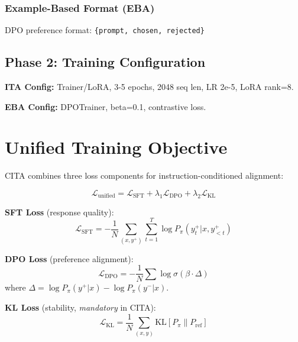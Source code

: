 \subsubsection{Example-Based Format (EBA)}

DPO preference format: \texttt{\{prompt, chosen, rejected\}}

\subsection{Phase 2: Training Configuration}

\textbf{ITA Config:} Trainer/LoRA, 3-5 epochs, 2048 seq len, LR 2e-5, LoRA rank=8.

\textbf{EBA Config:} DPOTrainer, beta=0.1, contrastive loss.


\section{Unified Training Objective}
\label{sec:unified_loss}

CITA combines three loss components for instruction-conditioned alignment:

\begin{equation}
\mathcal{L}_{\text{unified}} = \mathcal{L}_{\text{SFT}} + \lambda_1 \mathcal{L}_{\text{DPO}} + \lambda_2 \mathcal{L}_{\text{KL}}
\end{equation}

\noindent\textbf{SFT Loss} (response quality):
\begin{equation}
\mathcal{L}_{\text{SFT}} = -\frac{1}{N} \sum_{(x, y^+)} \sum_{t=1}^{T} \log P_\pi(y_t^+ | x, y_{<t}^+)
\end{equation}

\noindent\textbf{DPO Loss} (preference alignment):
\begin{equation}
\mathcal{L}_{\text{DPO}} = -\frac{1}{N} \sum \log \sigma \left( \beta \cdot \Delta \right)
\end{equation}
where $\Delta = \log P_\pi(y^+|x) - \log P_\pi(y^-|x)$.

\noindent\textbf{KL Loss} (stability, \textit{mandatory} in CITA):
\begin{equation}
\mathcal{L}_{\text{KL}} = \frac{1}{N} \sum_{(x,y)} \text{KL}[P_\pi \| P_{\text{ref}}]
\end{equation}


